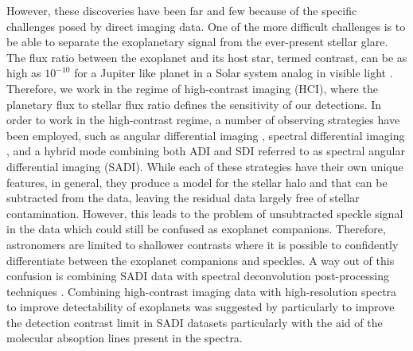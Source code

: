 \documentclass{aa}
\begin{document}
However, these discoveries have been far and few because of the specific challenges posed by direct imaging data.
One of the more difficult challenges is to be able to separate the exoplanetary signal from the ever-present stellar glare.
The flux ratio between the exoplanet and its host star, termed contrast, can be as high as $10^{-10}$ for a Jupiter like planet in a Solar system analog in visible light \citep[ for e.g][]{2023Galicher}.
Therefore, we work in the regime of high-contrast imaging (HCI), where the planetary flux to stellar flux ratio defines the sensitivity of our detections.
In order to work in the high-contrast regime, a number of observing strategies have been employed, such as angular differential imaging \citep[ADI, ][]{2006MaroisADI}, spectral differential imaging \citep[SDI, ][]{2002SparksSDI}, and a hybrid mode combining both ADI and SDI referred to as spectral angular differential imaging (SADI).
While each of these strategies have their own unique features, in general, they produce a model for the stellar halo and that can be subtracted from the data, leaving the residual data largely free of stellar contamination.
However, this leads to the problem of unsubtracted speckle signal in the data which could still be confused as exoplanet companions.
Therefore, astronomers are limited to shallower contrasts where it is possible to confidently differentiate between the exoplanet companions and speckles.
A way out of this confusion is combining SADI data with spectral deconvolution post-processing techniques \cite[as for e.g. in, ][]{2002SparksSDI, 2007ThatteSDI}.
Combining high-contrast imaging data with high-resolution spectra to improve detectability of exoplanets was suggested by \cite{2015Snellen} particularly to improve the detection contrast limit in SADI datasets particularly with the aid of the molecular absoption lines present in the spectra.
\end{document}
